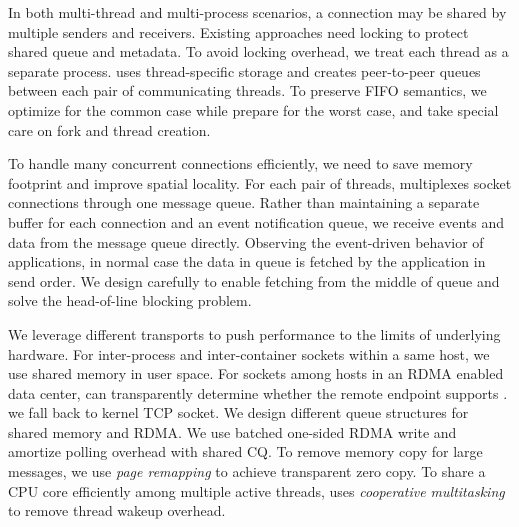 In both multi-thread and multi-process scenarios, a connection may be shared by multiple senders and receivers.
Existing approaches need locking to protect shared queue and metadata.
To avoid locking overhead, we treat each thread as a separate process.
\libipc{} uses thread-specific storage and creates peer-to-peer queues between each pair of communicating threads.
To preserve FIFO semantics, we optimize for the common case while prepare for the worst case, and take special care on fork and thread creation.

To handle many concurrent connections efficiently, we need to save memory footprint and improve spatial locality.
For each pair of threads, \sys multiplexes socket connections through one message queue.
Rather than maintaining a separate buffer for each connection and an event notification queue, we receive events and data from the message queue directly.
Observing the event-driven behavior of applications, in normal case the data in queue is fetched by the application in send order.
We design carefully to enable fetching from the middle of queue and solve the head-of-line blocking problem.

We leverage different transports to push performance to the limits of underlying hardware.
For inter-process and inter-container sockets within a same host, we use shared memory in user space.
For sockets among hosts in an RDMA enabled data center, \sys can transparently determine whether the remote endpoint supports \sys.
we fall back to kernel TCP socket.
We design different queue structures for shared memory and RDMA.
We use batched one-sided RDMA write and amortize polling overhead with shared CQ.
To remove memory copy for large messages, we use \emph{page remapping} to achieve transparent zero copy.
To share a CPU core efficiently among multiple active threads, \sys uses \emph{cooperative multitasking} to remove thread wakeup overhead.

\fi


